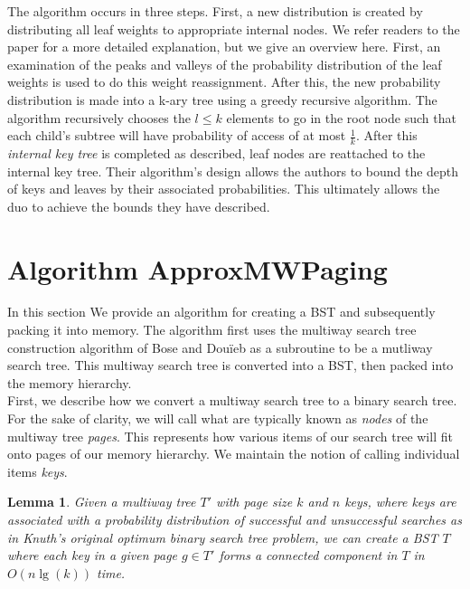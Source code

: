 \documentclass[letterpaper,12pt,titlepage,oneside,final]{book}
\theoremstyle{plain}
\newtheorem{lem}[thm]{Lemma}
\begin{document}
 The algorithm occurs in three steps. First, a new distribution is created by distributing all leaf weights to appropriate internal nodes. We refer readers to the paper \cite{bose2009efficient} for a more detailed explanation, but we give an overview here. First, an examination of the peaks and valleys of the probability distribution of the leaf weights is used to do this weight reassignment. After this, the new probability distribution is made into a k-ary tree using a greedy recursive algorithm. The algorithm recursively chooses the $l \leq k$ elements to go in the root node such that each child's subtree will have probability of access of at most $\frac{1}{k}$. After this \textit{internal key tree} is completed as described, leaf nodes are reattached to the internal key tree. Their algorithm's design allows the authors to bound the depth of keys and leaves by their associated probabilities. This ultimately allows the duo to achieve the bounds they have described. 

\section{Algorithm ApproxMWPaging}\label{Algorithm ApproxMWPaging}

In this section We provide an algorithm for creating a BST and subsequently packing it into memory. The algorithm first uses the multiway search tree construction algorithm of Bose and Dou\"{i}eb as a subroutine to be a mutliway search tree. This multiway search tree is converted into a BST, then packed into the memory hierarchy. \\

First, we describe how we convert a multiway search tree to a binary search tree. For the sake of clarity, we will call what are typically known as \textit{nodes} of the multiway tree \textit{pages}. This represents how various items of our search tree will fit onto pages of our memory hierarchy. We maintain the notion of calling individual items \textit{keys}.

\begin{lem}\label{MWTBSTLem}
Given a multiway tree $T'$ with page size $k$ and $n$ keys, where keys are associated with a probability distribution of successful and unsuccessful searches as in Knuth's original optimum binary search tree problem, we can create a BST $T$ where each key in a given page $g \in T'$ forms a connected component in $T$ in $O(n\lg(k))$ time.
\end{lem}
\end{document}
